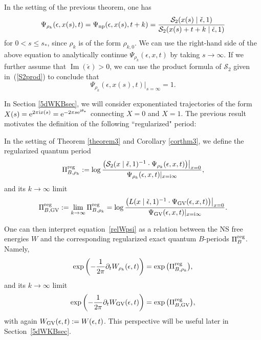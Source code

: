 \documentclass[pdftex]{sigma}
\numberwithin{equation}{section}
\begin{document}
\begin{Remark}\label{remper}
In the setting of the previous theorem, one has
\begin{equation*}
 \Psi_{\rho_{k}}(\epsilon,x(s),t)=\Psi_{{\rm np}}(\epsilon,x(s),t+k)=\frac{\mathcal{S}_2(x(s)\mid \check\epsilon,1)}{\mathcal{S}_2(x(s)+t+k\mid \check\epsilon,1)}
\end{equation*}
for $0<s\leq s_*$, since $\rho_k$ is of the form $\rho_{k,0}$.
We can use the right-hand side of the above equation to analytically continue $\Psi_{\rho_{k}}(\epsilon,x,t)$ by taking $s\to \infty$. If we further assume that $\operatorname{Im}(\check\epsilon)>0$, we can use the product formula of $\mathcal{S}_2$ given in~(\ref{S2prod}) to conclude that
\begin{equation*}
 \Psi_{\rho_{k}}(\epsilon,x(s),t)|_{s=\infty}=1.
\end{equation*}

In Section \ref{5dWKBsec}, we will consider exponentiated trajectories of the form $X(s)={\rm e}^{2\pi {\rm i}x(s)}={\rm e}^{-2\pi s{\rm e}^{{\rm i}\theta_*}}$ connecting $X=0$ and $X=1$. The previous result motivates the definition of the following ``regularized" period:

\begin{Definition}\label{def:regBperiod}
In the setting of Theorem \ref{theorem3} and Corollary \ref{corthm3}, we define the regularized quantum period
\begin{equation*}
\Pi_{B,\rho_k}^{\rm reg} := \log \frac{\big(\mathcal{S}_2(x\mid \check\epsilon,1)^{-1}\cdot \Psi_{\rho_k}(\epsilon,x,t)\big)\big|_{x=0}}{\Psi_{\rho_k}(\epsilon,x,t)|_{x=\mathrm{i}\infty}},
\end{equation*}
and its $k \to \infty$ limit
\begin{equation*}
\Pi_{B,\mathrm{GV}}^{\rm reg} := \lim_{k \to \infty} \Pi_{B,\rho_k}^{\rm reg} = \log \frac{\big(L(x\mid \check\epsilon,1)^{-1}\cdot \Psi_{\mathrm{GV}}(\epsilon,x,t)\big)\big|_{x=0}}{\Psi_{\mathrm{GV}}(\epsilon,x,t)|_{x=\mathrm{i}\infty}}.
\end{equation*}
\end{Definition}

One can then interpret equation~\eqref{relWpsi} as a relation between the NS free energies $W$ and the corresponding regularized exact quantum $B$-periods $\Pi_{B}^{\rm reg}$. Namely,
\begin{equation*}
 \exp\left(-\frac{1}{2\pi}\partial_tW_{\rho_k}(\epsilon,t)\right)=\exp\big(\Pi_{B,\rho_k}^{\rm reg}\big),
\end{equation*}
and its $k \to \infty$ limit
\begin{equation*}
 \exp\left(-\frac{1}{2\pi}\partial_tW_{\mathrm{GV}}(\epsilon,t)\right)=\exp\big(\Pi_{B,\mathrm{GV}}^{\rm reg}\big),
\end{equation*}
with again $W_{{\rm GV}}(\epsilon,t):=W(\epsilon,t)$.
This perspective will be useful later in Section~\ref{5dWKBsec}.
\end{Remark}
\end{document}
